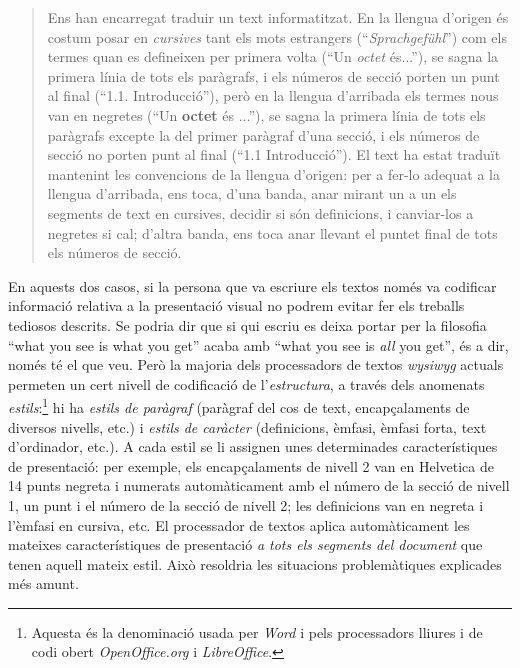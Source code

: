   \begin{quote}
    Ens han encarregat traduir un text informatitzat. En la llengua
    d'origen és costum posar en \emph{cursives} tant els mots
    estrangers (``\emph{Sprachgefühl}'') com els termes quan es
    defineixen per primera volta (``Un \emph{octet} és...''), se sagna
    la primera línia de tots els paràgrafs, i els números de secció
    porten un punt al final (``1.1. Introducció''), però en la llengua
    d'arribada els termes nous van en negretes (``Un \textbf{octet} és
    ...''), se sagna la primera línia de tots els paràgrafs excepte la
    del primer paràgraf d'una secció, i els números de secció no
    porten punt al final (``1.1 Introducció''). El text ha estat
    traduït mantenint les convencions de la llengua d'origen: per a
    fer-lo adequat a la llengua d'arribada, ens toca, d'una banda,
    anar mirant un a un els segments de text en cursives, decidir si
    són definicions, i canviar-los a negretes si cal; d'altra banda,
    ens toca anar llevant el puntet final de tots els números de
    secció.
  \end{quote}
  
  En aquests dos casos, si la persona que va escriure els textos només
  va codificar informació relativa a la presentació visual no podrem
  evitar fer els treballs tediosos descrits. Se podria dir que si qui
  escriu es deixa portar per la filosofia ``what you see is what you
  get'' acaba amb ``what you see is \emph{all} you get'', és a dir,
  només té el que veu. Però la majoria dels processadors de textos
  \emph{wysiwyg} actuals permeten un cert nivell de codificació de
  l'\emph{estructura}, a través dels anomenats
  \emph{estils}:\footnote{Aquesta és la denominació usada per
    \emph{Word} i pels processadors lliures i de codi obert
    \emph{OpenOffice.org} i \emph{LibreOffice}.} hi ha \emph{estils de paràgraf} (paràgraf
  del cos de text, encapçalaments de diversos nivells, etc.) i
  \emph{estils de caràcter} (definicions, èmfasi, èmfasi forta, text
  d'ordinador, etc.).\label{pg:estil} A cada estil se li assignen unes determinades
  característiques de presentació: per exemple, els encapçalaments de
  nivell 2 van en Helvetica de 14 punts negreta i numerats
  automàticament amb el número de la secció de nivell 1, un punt i el
  número de la secció de nivell 2; les definicions van en negreta i
  l'èmfasi en cursiva, etc. El processador de textos aplica
  automàticament les mateixes característiques de presentació \emph{a
    tots els segments del document} que tenen aquell mateix estil.
  Això resoldria les situacions problemàtiques explicades més amunt.
  
